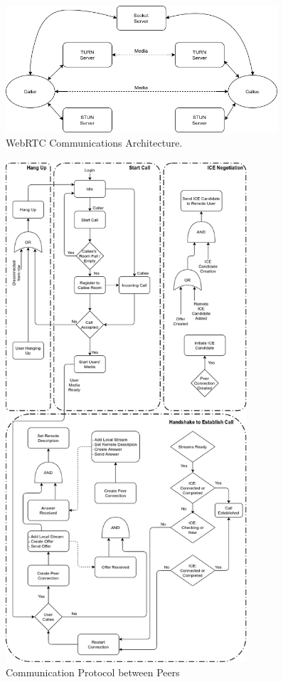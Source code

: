 \begin{figure}[h!]
    \caption{WebRTC Communications Architecture.}
    \label{image:webRTCCommsArch}
    \centering
    \includegraphics[width=0.9\textwidth]{images/WebRTCCommsArchitecture.png}
\end{figure}

\begin{figure}[h!]
    \caption{Communication Protocol between Peers \cite{14003034520191201}}
    \label{image:commsProtocol}
    \centering
    \includegraphics[width=0.8\textwidth]{images/CommunicationProtocol.png}
\end{figure}

